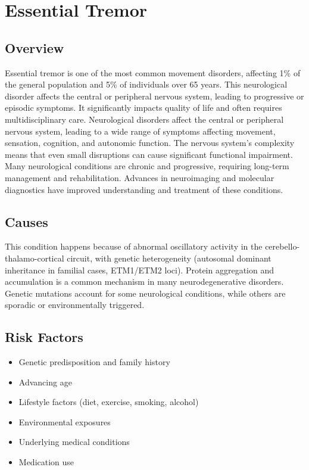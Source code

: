 \chapter{Essential Tremor}
\label{sec:Essential Tremor}

\section{Overview}
Essential tremor is one of the most common movement disorders, affecting 1\% of the general population and 5\% of individuals over 65 years. This neurological disorder affects the central or peripheral nervous system, leading to progressive or episodic symptoms. It significantly impacts quality of life and often requires multidisciplinary care. Neurological disorders affect the central or peripheral nervous system, leading to a wide range of symptoms affecting movement, sensation, cognition, and autonomic function. The nervous system's complexity means that even small disruptions can cause significant functional impairment. Many neurological conditions are chronic and progressive, requiring long-term management and rehabilitation. Advances in neuroimaging and molecular diagnostics have improved understanding and treatment of these conditions.
\section{Causes}
This condition happens because of abnormal oscillatory activity in the cerebello-thalamo-cortical circuit, with genetic heterogeneity (autosomal dominant inheritance in familial cases, ETM1/ETM2 loci).    Protein aggregation and accumulation is a common mechanism in many neurodegenerative disorders.  Genetic mutations account for some neurological conditions, while others are sporadic or environmentally triggered.   
\section{Risk Factors}
\begin{itemize}[noitemsep]
  \item Genetic predisposition and family history
  \item Advancing age
  \item Lifestyle factors (diet, exercise, smoking, alcohol)
  \item Environmental exposures
  \item Underlying medical conditions
  \item Medication use
\end{itemize}
